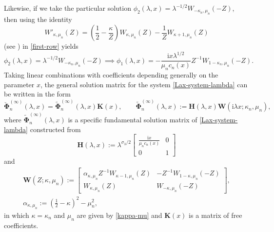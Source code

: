 \documentclass[pdftex]{sigma}
\numberwithin{equation}{section}
\newcommand{\ii}{\mathrm{i}}
\newcommand{\para}[1]{\breve{#1}}
\begin{document}
Likewise, if we take the particular solution $\phi_2(\lambda,x)=\lambda^{-1/2}W_{-\kappa_n,\mu_n}(-Z)$, then using the identity
\begin{equation*}
 W'_{\kappa, \mu_n}(Z) = \left( \dfrac{1}{2} - \dfrac{\kappa}{Z} \right)W_{\kappa, \mu_n}(Z) - \dfrac{1}{Z} W_{\kappa+1, \mu_n}(Z)
\end{equation*}
(see \cite[equation~(13.15.26)]{DLMF}) in \eqref{first-row} yields
\begin{equation*}
 \phi_2(\lambda,x)=\lambda^{-1/2}W_{-\kappa_n,\mu_n}(-Z)\implies \phi_1(\lambda,x)=-\frac{\ii x\lambda^{1/2}}{\mu_n c_n(x)}Z^{-1}W_{1-\kappa_n,\mu_n}(-Z).
\end{equation*}
Taking linear combinations with coefficients depending generally on the parameter $x$, the general solution matrix for the system \eqref{Lax-system-lambda} can be written in the form
\begin{equation}
 \para{\boldsymbol\Phi}_n^{(\infty)}(\lambda,x)=\widetilde{\boldsymbol\Phi}^{(\infty)}_n(\lambda,x)\mathbf{K}(x),\qquad\widetilde{\boldsymbol\Phi}_n^{(\infty)}(\lambda,x):=\mathbf{H}(\lambda,x)\mathbf{W}(\ii\lambda x;\kappa_n,\mu_n),
 \label{Psi0-define}
\end{equation}
where $\widetilde{\mathbf{\Phi}}_n^{(\infty)}(\lambda,x)$ is a specific fundamental solution matrix of \eqref{Lax-system-lambda} constructed from
\begin{equation}
 \mathbf{H}(\lambda,x):=\lambda^{\sigma_3/2}\begin{bmatrix}\displaystyle\frac{\ii x}{\mu_n c_n(x)} & 0\\0 & 1\end{bmatrix}
 \label{H-define}
\end{equation}
and
\begin{gather}
 \mathbf{W}(Z;\kappa,\mu_n):=
 \begin{bmatrix}
 \alpha_{\kappa,\mu_n}Z^{-1}W_{\kappa-1,\mu_n}(Z) & -Z^{-1}W_{1-\kappa,\mu_n}(-Z)\\
 W_{\kappa,\mu_n}(Z) & W_{-\kappa,\mu_n}(-Z)
 \end{bmatrix},\nonumber\\ \alpha_{\kappa,\mu_n}:=\left(\frac{1}{2}-\kappa\right)^2-\mu_n^2,
 \label{M-alpha-define}
\end{gather}
in which $\kappa=\kappa_n$ and $\mu_n$ are given by \eqref{kappa-mu} and $\mathbf{K}(x)$ is a matrix of free coefficients.
\end{document}
